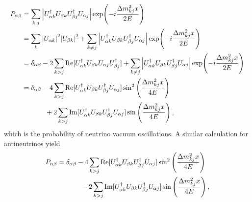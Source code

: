 \begin{align}\label{eq:Pab} 
    P_{\ab} &= \sum_{k,j} \abs{U_{\a k} ^ \dagger U_{\b k}U_{\b j}^\dagger U_{\a j}} \exp(-i\frac{\dm_{kj}x}{2E}) \nonumber \\
            &=  \sum_k \abs{U_{\a k}}^2\abs{U_{\b k}}^2 + \sum_{k \neq j} \abs{U_{\a k} ^ \dagger U_{\b k}U_{\b j}^\dagger U_{\a j}} \exp(-i\frac{\dm_{kj}x}{2E}) \nonumber \\
            &= \delta_{\a \b} - 2 \sum_{k>j}\Re[U_{\a k}^\dagger U_{\b k} U_{\a j} U_{\b j}^\dagger] +\sum_{k \neq j} \abs{U_{\a k} ^ \dagger U_{\b k}U_{\b j}^\dagger U_{\a j}} \exp(-i\frac{\dm_{kj}x}{2E}) \nonumber \\
            &= \delta_{\a \b} - 4\sum_{k > j} \Re[U_{\a k} ^ \dagger U_{\b k}U_{\b j}^\dagger U_{\a j}] \sin^2{\left(\frac{\dm_{kj}x}{4E}\right)} \nonumber \\
            &\hspace{1.2cm}+ 2\sum_{k > j} \Im[U_{\a k} ^ \dagger U_{\b k}U_{\b j}^\dagger U_{\a j}] \sin{\left(\frac{\dm_{kj}x}{4E}\right)}\,,
\end{align}
which is the probability of neutrino vacuum oscillations.
A similar calculation for antineutrinos yield  
\begin{align}\label{eq:Pab} 
    P_{\ab} 
            &= \delta_{\a \b} - 4\sum_{k > j} \Re[U_{\a k} ^ \dagger U_{\b k}U_{\b j}^\dagger U_{\a j}] \sin^2{\left(\frac{\dm_{kj}x}{4E}\right)} \nonumber \\
            &\hspace{1.2cm}- 2\sum_{k > j} \Im[U_{\a k} ^ \dagger U_{\b k}U_{\b j}^\dagger U_{\a j}] \sin{\left(\frac{\dm_{kj}x}{4E}\right)}\,,
\end{align}

